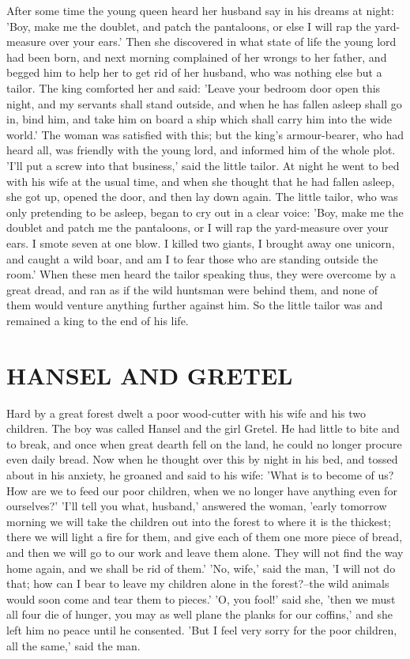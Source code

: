 \documentclass[12pt]{book}
\begin{document}
After some time the young queen heard her husband say in his dreams at
night: 'Boy, make me the doublet, and patch the pantaloons, or else I
will rap the yard-measure over your ears.' Then she discovered in what
state of life the young lord had been born, and next morning
complained of her wrongs to her father, and begged him to help her to
get rid of her husband, who was nothing else but a tailor. The king
comforted her and said: 'Leave your bedroom door open this night, and
my servants shall stand outside, and when he has fallen asleep shall
go in, bind him, and take him on board a ship which shall carry him
into the wide world.' The woman was satisfied with this; but the
king's armour-bearer, who had heard all, was friendly with the young
lord, and informed him of the whole plot. 'I'll put a screw into that
business,' said the little tailor. At night he went to bed with his
wife at the usual time, and when she thought that he had fallen
asleep, she got up, opened the door, and then lay down again. The
little tailor, who was only pretending to be asleep, began to cry out
in a clear voice: 'Boy, make me the doublet and patch me the
pantaloons, or I will rap the yard-measure over your ears. I smote
seven at one blow. I killed two giants, I brought away one unicorn,
and caught a wild boar, and am I to fear those who are standing
outside the room.' When these men heard the tailor speaking thus, they
were overcome by a great dread, and ran as if the wild huntsman were
behind them, and none of them would venture anything further against
him. So the little tailor was and remained a king to the end of his
life.



\chapter{HANSEL AND GRETEL}

Hard by a great forest dwelt a poor wood-cutter with his wife and his
two children. The boy was called Hansel and the girl Gretel. He had
little to bite and to break, and once when great dearth fell on the
land, he could no longer procure even daily bread. Now when he thought
over this by night in his bed, and tossed about in his anxiety, he
groaned and said to his wife: 'What is to become of us? How are we to
feed our poor children, when we no longer have anything even for
ourselves?' 'I'll tell you what, husband,' answered the woman, 'early
tomorrow morning we will take the children out into the forest to
where it is the thickest; there we will light a fire for them, and
give each of them one more piece of bread, and then we will go to our
work and leave them alone. They will not find the way home again, and
we shall be rid of them.' 'No, wife,' said the man, 'I will not do
that; how can I bear to leave my children alone in the forest?--the
wild animals would soon come and tear them to pieces.' 'O, you fool!'
said she, 'then we must all four die of hunger, you may as well plane
the planks for our coffins,' and she left him no peace until he
consented. 'But I feel very sorry for the poor children, all the
same,' said the man.
\end{document}
